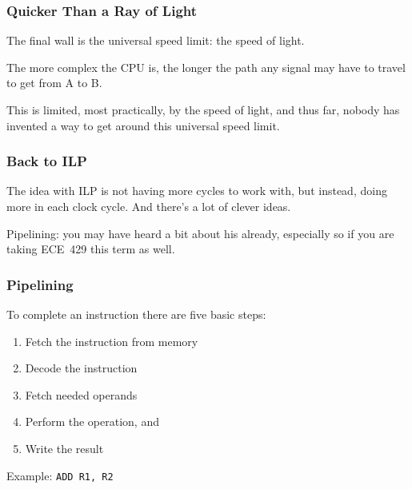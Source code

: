 \begin{frame}
\frametitle{Quicker Than a Ray of Light}

The final wall is the universal speed limit: the speed of light.

 The more complex the CPU is, the longer the path any signal may have to travel to get from A to B. 
 
 This is limited, most practically, by the speed of light, and thus far, nobody has invented a way to get around this universal speed limit.
\end{frame}



\begin{frame}
\frametitle{Back to ILP}

The idea with ILP is not having more cycles to work with, but instead, doing more in each clock cycle. And there's a lot of clever ideas. 

Pipelining: you may have heard a bit about his already, especially so if you are taking ECE~429 this term as well.

\end{frame}



\begin{frame}
\frametitle{Pipelining}

To complete an instruction there are five basic steps:
\begin{enumerate}
\item Fetch the instruction from memory
\item Decode the instruction
\item Fetch needed operands
\item Perform the operation, and 
\item Write the result
\end{enumerate}

Example: \texttt{ADD R1, R2}


\end{frame}



